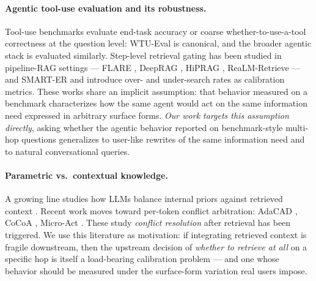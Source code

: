 \documentclass[10pt,letterpaper]{article}
\begin{document}
\paragraph{Agentic tool-use evaluation and its robustness.}
Tool-use benchmarks evaluate end-task accuracy or coarse whether-to-use-a-tool
correctness at the question level: WTU-Eval \citep{wtu2024} is canonical, and the
broader agentic stack \citep{toolformer2023,rare2025,selfrag2024} is evaluated
similarly. Step-level retrieval gating has been studied in pipeline-RAG settings ---
FLARE \citep{flare2023}, DeepRAG \citep{deeprag2025}, HiPRAG \citep{hiprag2025},
ReaLM-Retrieve \citep{realmretrieve2026} --- and SMART-ER \citep{smarter2025} and
\citet{betaGRPO2025} introduce over- and under-search rates as calibration metrics.
These works share an implicit assumption: that behavior measured on a benchmark
characterizes how the same agent would act on the same information need expressed
in arbitrary surface forms. \emph{Our work targets this assumption directly}, asking
whether the agentic behavior reported on benchmark-style multi-hop questions
generalizes to user-like rewrites of the same information need and to natural
conversational queries.

\paragraph{Parametric vs.\ contextual knowledge.}
A growing line studies how LLMs balance internal priors against retrieved context
\citep{cheng2024interplay,wu2024clasheval,farahani2024deciphering,kim2025reliability,wadhwa2026rags,tao2024context,zhang2024fusion}.
Recent work moves toward per-token conflict arbitration: AdaCAD
\citep{adacad2025}, CoCoA \citep{cocoa2025}, Micro-Act \citep{microact2025}. These
study \emph{conflict resolution} after retrieval has been triggered. We use this
literature as motivation: if integrating retrieved context is fragile downstream,
then the upstream decision of \emph{whether to retrieve at all} on a specific hop is
itself a load-bearing calibration problem --- and one whose behavior should be
measured under the surface-form variation real users impose.
\end{document}
